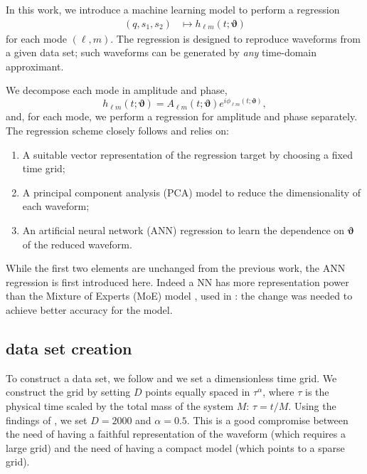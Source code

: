 \documentclass[twocolumn,showpacs,preprintnumbers,nofootinbib,prd,
superscriptaddress,10pt]{revtex4-1}
\begin{document}
In this work, we introduce a machine learning model to perform a regression
\begin{align}\label{eq:objective}
	(q, s_1, s_2) &\longmapsto h_{\ell m}(t; \boldsymbol{\vartheta})
\end{align}
for each mode $(\ell,m)$.
The regression is designed to reproduce waveforms from a given data set; such waveforms can be generated 
by {\it any} time-domain approximant.

We decompose each mode in amplitude and phase,
\begin{equation}
	h_{\ell m}(t; \boldsymbol{\vartheta}) = A_{\ell m}(t; \boldsymbol{\vartheta}) e^{i \phi_{\ell m}(t; \boldsymbol{\vartheta})},
\end{equation}
and, for each mode, we perform a regression for amplitude and phase separately. The regression scheme closely follows \cite{Schmidt:2020yuu} and relies on:
\begin{enumerate}[label=(\alph*)]
	\item A suitable vector representation of the regression target by choosing a fixed time grid;
	\item A principal component analysis (PCA) model to reduce the dimensionality of each waveform;
	\item An artificial neural network (ANN) regression to learn the dependence on $\boldsymbol{\vartheta}$ of the 
	reduced waveform.
\end{enumerate}

While the first two elements are unchanged from the previous work, the ANN regression is first introduced here. Indeed a NN has more representation power than the Mixture of Experts (MoE) model \cite{Jacobs1991AdaptiveMoE}, used in \cite{Schmidt:2020yuu}: the change was needed to achieve better accuracy for the model.

\subsection{data set creation}
\label{sec:data set}

To construct a data set, we follow \cite{Schmidt:2020yuu} and we set a dimensionless time grid. We construct the grid 
by setting $D$ points equally spaced in $\tau^\alpha$, where $\tau$ is the physical time scaled by the total mass of 
the system $M$: $\tau = t/M$. Using the findings of \cite{Schmidt:2020yuu}, we set $D = \text{2000}$ and 
$\alpha = \text{0.5}$.
%
This is a good compromise between the need of having a faithful representation of the waveform (which requires 
a large grid) and the need of having a compact model (which points to a sparse grid).
\end{document}
